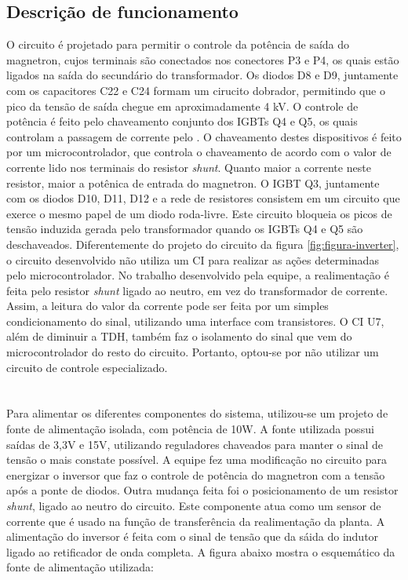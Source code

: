 \subsection{Descrição de funcionamento}
O circuito é projetado para permitir o controle da potência de saída do magnetron, cujos terminais são conectados nos conectores P3 e P4, os quais estão ligados na saída do secundário do transformador. Os diodos D8 e D9, juntamente com os capacitores C22 e C24 formam um cirucito dobrador,  permitindo que o pico da tensão de saída chegue em aproximadamente 4 kV. O controle de potência é feito pelo chaveamento conjunto dos IGBTs Q4 e Q5, os quais controlam a passagem de corrente pelo . O chaveamento destes dispositivos é feito por um microcontrolador, que controla o chaveamento de acordo com o valor de corrente lido nos terminais do resistor \textit{shunt}. Quanto maior a corrente neste resistor, maior a potênica de entrada do magnetron. O IGBT Q3, juntamente com os diodos D10, D11, D12 e a rede de resistores consistem em um circuito que exerce o mesmo papel de um diodo roda-livre. Este circuito bloqueia os picos de tensão induzida gerada pelo transformador quando os IGBTs Q4 e Q5 são deschaveados.
Diferentemente do projeto do circuito  da figura \ref{fig:figura-inverter}, o circuito desenvolvido não utiliza um CI para realizar as ações determinadas pelo microcontrolador. No trabalho desenvolvido pela equipe, a realimentação é feita pelo resistor \textit{shunt} ligado ao neutro, em vez do transformador de corrente. Assim, a leitura do valor da corrente pode ser feita por um simples condicionamento do sinal, utilizando uma interface com transistores. O CI U7, além de diminuir a TDH, também faz o isolamento do sinal que vem do microcontrolador do resto do circuito. Portanto, optou-se por não utilizar um circuito de controle especializado.



\section{}
\label{sec:font}

Para alimentar os diferentes componentes do sistema, utilizou-se um projeto de fonte de alimentação isolada, com potência de 10W. A fonte utilizada possui saídas de 3,3V e 15V, utilizando reguladores chaveados para manter o sinal de tensão o mais constate possível. A equipe fez uma modificação no circuito para energizar o inversor que faz o controle de potência do magnetron com a tensão após a ponte de diodos. Outra mudança feita foi o posicionamento de um resistor \textit{shunt}, ligado ao neutro do circuito. Este componente atua como um sensor de corrente que é usado na função de transferência da realimentação da planta. A alimentação do inversor é feita com o sinal de tensão que da sáida do indutor ligado ao retificador de onda completa.  A figura abaixo mostra o esquemático da fonte de alimentação utilizada:


